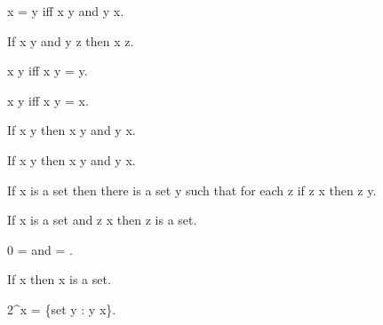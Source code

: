 \documentclass[a4paper,draft]{amsproc}
\begin{document}
\begin{forthel}
\begin{theorem}[27]
x = y iff x \subset y and y \subset x.
\end{theorem}

\begin{theorem}[28]
If x \subset y and y \subset z then x \subset z.
\end{theorem}

\begin{theorem}[29]
x \subset y iff x \cup y = y.
\end{theorem}

\begin{theorem}[30]
x \subset y iff x \cap y = x.
\end{theorem}

\begin{theorem}[31]
If x \subset y then \bigcup x \subset \bigcup y
and \bigcap y \subset \bigcap x.
\end{theorem}

\begin{theorem}[32]
If x \in y then x \subset \bigcup y 
and \bigcap y \subset x.
\end{theorem}


\begin{axiom}
If x is a set then there is a set y such that for each
z if z \subset x then z \in y.
\end{axiom}


\begin{theorem}[33]
If x is a set and z \subset x then z is a set.
\end{theorem}

\begin{theorem}[34]
0 = \bigcap {} and  = \bigcup {}.
\end{theorem}

\begin{theorem}[35]
If x  then \bigcap x is a set.
\end{theorem}

\begin{definition}[36]
2^{x} = \{set y : y \subset x\}.
\end{definition}


\end{forthel}
\end{document}
